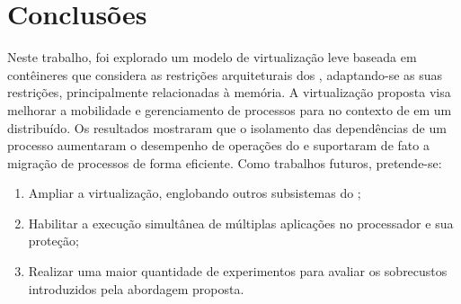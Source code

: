 \glsresetall
\chapter{Conclusões}
\label{chap.conclusions}

Neste trabalho, foi explorado um modelo de virtualização leve baseada em contêineres que considera as restrições arquiteturais dos \lws, adaptando-se as suas restrições, principalmente relacionadas à memória. A virtualização proposta visa melhorar a mobilidade e gerenciamento de processos para \lws no contexto de em um \os distribuído.
%
Os resultados mostraram que o isolamento das dependências de um processo aumentaram o desempenho de operações do  e suportaram de fato a migração de processos de forma eficiente. Como trabalhos futuros, pretende-se:

\begin{enumerate}[label=(\roman*)]
    \item Ampliar a virtualização, englobando outros subsistemas do \nanvix;
    \item Habilitar a execução simultânea de múltiplas aplicações no processador e sua proteção;
    \item Realizar uma maior quantidade de experimentos para avaliar os sobrecustos introduzidos pela abordagem proposta.
\end{enumerate}